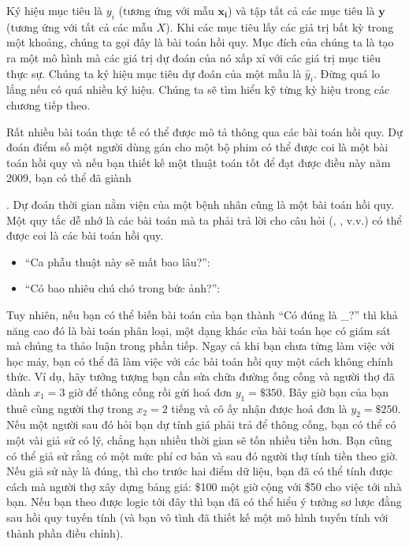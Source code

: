 \documentclass[letterpaper,11pt,english]{sphinxmanual}
\begin{document}
Ký hiệu mục tiêu là \(y_i\) (tương ứng với mẫu \(\mathbf{x_i}\))
và tập tất cả các mục tiêu là \(\mathbf{y}\) (tương ứng với tất cả
các mẫu \(X\)). Khi các mục tiêu lấy các giá trị bất kỳ trong một
khoảng, chúng ta gọi đây là bài toán hồi quy. Mục đích của chúng ta là
tạo ra một mô hình mà các giá trị dự đoán của nó xấp xỉ với các giá trị
mục tiêu thực sự. Chúng ta ký hiệu mục tiêu dự đoán của một mẫu là
\(\hat{y}_i\). Đừng quá lo lắng nếu có quá nhiều ký hiệu. Chúng ta
sẽ tìm hiểu kỹ từng kỳ hiệu trong các chương tiếp theo.



Rất nhiều bài toán thực tế có thể được mô tả thông qua các bài toán hồi
quy. Dự đoán điểm số một người dùng gán cho một bộ phim có thể được coi
là một bài toán hồi quy và nếu bạn thiết kế một thuật toán tốt để đạt
được điều này năm 2009, bạn có thể đã giành %
\begin{footnote}[29]\sphinxAtStartFootnote
{}
%
\end{footnote}. Dự đoán
thời gian nằm viện của một bệnh nhân cũng là một bài toán hồi quy. Một
quy tắc dễ nhớ là các bài toán mà ta phải trả lời cho câu hỏi  (, , v.v.) có thể được coi là các bài toán hồi
quy.


\begin{itemize}
\item {} 
“Ca phẫu thuật này sẽ mất bao lâu?”: 

\item {} 
“Có bao nhiêu chú chó trong bức ảnh?”: 

\end{itemize}



Tuy nhiên, nếu bạn có thể biến bài toán của bạn thành “Có đúng là \_?”
thì khả năng cao đó là bài toán phân loại, một dạng khác của bài toán
học có giám sát mà chúng ta thảo luận trong phần tiếp. Ngay cả khi bạn
chưa từng làm việc với học máy, bạn có thể đã làm việc với các bài toán
hồi quy một cách không chính thức. Ví dụ, hãy tưởng tượng bạn cần sửa
chữa đường ống cống và người thợ đã dành \(x_1=3\) giờ để thông cống
rồi gửi hoá đơn \(y_1 = \$350\). Bây giờ bạn của bạn thuê cùng người
thợ trong \(x_2 = 2\) tiếng và cô ấy nhận được hoá đơn là
\(y_2 = \$250\). Nếu một người sau đó hỏi bạn dự tính giá phải trả
để thông cống, bạn có thể có một vài giả sử có lý, chẳng hạn nhiều thời
gian sẽ tốn nhiều tiền hơn. Bạn cũng có thể giả sử rằng có một mức phí
cơ bản và sau đó người thợ tính tiền theo giờ. Nếu giả sử này là đúng,
thì cho trước hai điểm dữ liệu, bạn đã có thể tính được cách mà người
thợ xây dựng bảng giá: \$100 một giờ cộng với \$50 cho việc tới nhà bạn.
Nếu bạn theo được logic tới đây thì bạn đã có thể hiểu ý tưởng sơ lược
đằng sau hồi quy tuyến tính (và bạn vô tình đã thiết kế một mô hình
tuyến tính với thành phần điều chỉnh).
\end{document}
